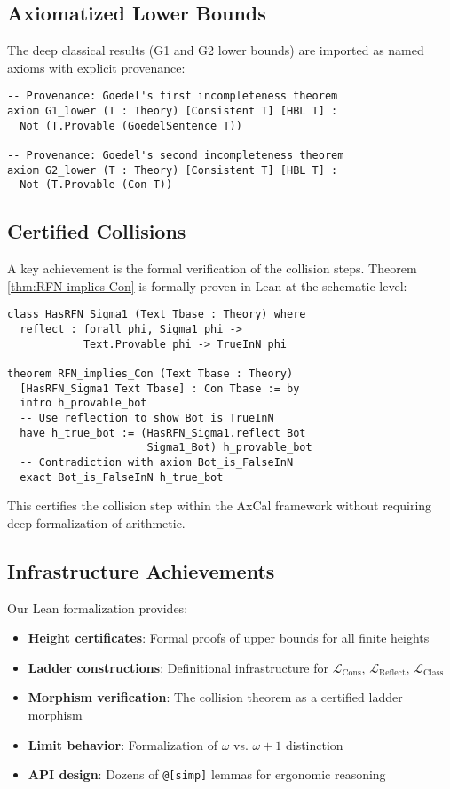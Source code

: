 \documentclass[11pt]{article}
\newcommand{\LCons}{\mathcal{L}_{\mathrm{Cons}}}
\newcommand{\LReflect}{\mathcal{L}_{\mathrm{Reflect}}}
\newcommand{\LClass}{\mathcal{L}_{\mathrm{Class}}}
\begin{document}
\subsection{Axiomatized Lower Bounds}
The deep classical results (G1 and G2 lower bounds) are imported as named axioms with explicit provenance:

\begin{lstlisting}[language=Lean, caption={Named Classical Axioms}]
-- Provenance: Goedel's first incompleteness theorem
axiom G1_lower (T : Theory) [Consistent T] [HBL T] :
  Not (T.Provable (GoedelSentence T))

-- Provenance: Goedel's second incompleteness theorem  
axiom G2_lower (T : Theory) [Consistent T] [HBL T] :
  Not (T.Provable (Con T))
\end{lstlisting}

\subsection{Certified Collisions}
A key achievement is the formal verification of the collision steps. Theorem \ref{thm:RFN-implies-Con} is formally proven in Lean at the schematic level:

\begin{lstlisting}[language=Lean, caption={Schematic Proof of RFN implies Con}]
class HasRFN_Sigma1 (Text Tbase : Theory) where
  reflect : forall phi, Sigma1 phi -> 
            Text.Provable phi -> TrueInN phi

theorem RFN_implies_Con (Text Tbase : Theory) 
  [HasRFN_Sigma1 Text Tbase] : Con Tbase := by
  intro h_provable_bot
  -- Use reflection to show Bot is TrueInN
  have h_true_bot := (HasRFN_Sigma1.reflect Bot 
                      Sigma1_Bot) h_provable_bot
  -- Contradiction with axiom Bot_is_FalseInN
  exact Bot_is_FalseInN h_true_bot
\end{lstlisting}

This certifies the collision step within the AxCal framework without requiring deep formalization of arithmetic.

\subsection{Infrastructure Achievements}
Our Lean formalization provides:
\begin{itemize}
\item \textbf{Height certificates}: Formal proofs of upper bounds for all finite heights
\item \textbf{Ladder constructions}: Definitional infrastructure for $\LCons$, $\LReflect$, $\LClass$
\item \textbf{Morphism verification}: The collision theorem as a certified ladder morphism
\item \textbf{Limit behavior}: Formalization of $\omega$ vs. $\omega+1$ distinction
\item \textbf{API design}: Dozens of \texttt{@[simp]} lemmas for ergonomic reasoning
\end{itemize}
\end{document}
